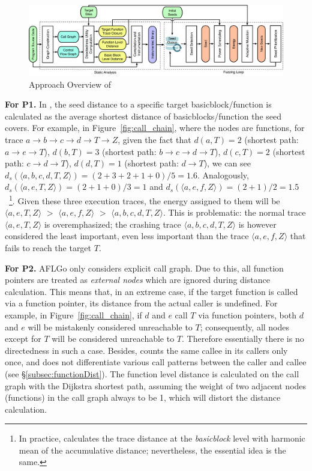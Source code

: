 \begin{figure}[ht]
	\includegraphics[width=.99\columnwidth]{res/dfot/overview.pdf}
	\caption{Approach Overview of \dFOT}
	\label{fig:overview}
\end{figure}

\textbf{For P1.} 
In \aflgo, the seed distance to a specific target basicblock/function is calculated as the average shortest distance of basicblocks/function the seed covers. For example, in Figure~\ref{fig:call_chain}, where the nodes are functions, for trace $a\rightarrow b\rightarrow c\rightarrow d\rightarrow T\rightarrow Z$, given the fact that $d(a, T)=2$ (shortest path: $a\rightarrow e\rightarrow T$), $d(b,T)=3$ (shortest path: $b\rightarrow c\rightarrow d\rightarrow T$), $d(c,T)=2$ (shortest path: $c\rightarrow d\rightarrow T$), $d(d,T)=1$ (shortest path: $d\rightarrow T$), we can see $d_s(\langle a,b,c,d,T,Z\rangle)=(2+3+2+1+0)/5=1.6$. Analogously, $d_s(\langle a,e,T,Z\rangle)=(2+1+0)/3=1$ and $d_s(\langle a,e,f,Z\rangle)=(2+1)/2=1.5$~\footnote{In practice, \aflgo calculates the trace distance at the \emph{basicblock} level with harmonic mean of the accumulative distance; nevertheless, the essential idea is the same.}. 
Given these three execution traces, the energy assigned to them will be $ \langle a, e, T, Z\rangle$ $>$ $\langle a, e, f , Z\rangle$ $>$ $\langle a, b, c, d, T, Z\rangle$.
This is problematic: the normal trace $\langle a, e, T, Z\rangle $ is overemphasized; the crashing trace $\langle a, b, c, d, T, Z\rangle$ is however considered the least important, even less important than the trace $\langle a, e, f , Z\rangle$ that fails to reach the target $T$.



\textbf{For P2.} AFLGo only considers explicit call graph.
Due to this, all function pointers are treated as \emph{external nodes} which 
are ignored during distance calculation. 
This means that, in an extreme case, if the target function is called via a function pointer, its distance from the actual caller is undefined. 
For example, in Figure~\ref{fig:call_chain}, if $d$ and $e$ call $T$ via function pointers, both $d$ and $e$ will be mistakenly considered unreachable to $T$; consequently, all nodes except for $T$ will be considered unreachable to $T$. Therefore essentially there is no directedness in such a case.
Besides, \aflgo counts the same callee in its callers only once, and does not differentiate various call patterns between the caller and callee (see \S\ref{subsec:functionDist}).
The function level distance is calculated on the call graph with the Dijkstra shortest path, assuming the weight of two adjacent nodes (functions) in the call graph always to be 1, which will distort the distance calculation. 


